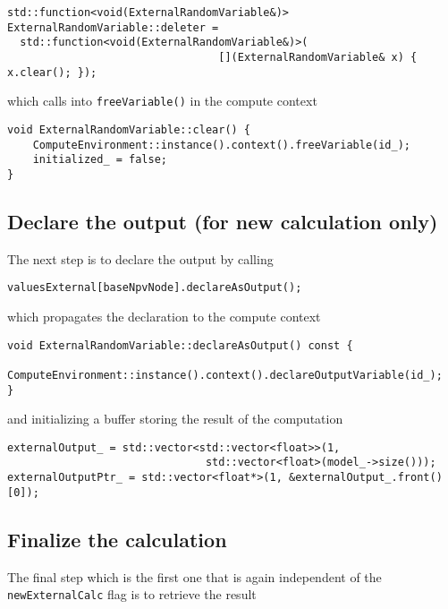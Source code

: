 \documentclass[12pt, a4paper]{article}
\begin{document}
\begin{verbatim}
std::function<void(ExternalRandomVariable&)> ExternalRandomVariable::deleter =
  std::function<void(ExternalRandomVariable&)>(
                                 [](ExternalRandomVariable& x) { x.clear(); });
\end{verbatim}

which calls into \verb+freeVariable()+ in the compute context

\begin{verbatim}
void ExternalRandomVariable::clear() {
    ComputeEnvironment::instance().context().freeVariable(id_);
    initialized_ = false;
}
\end{verbatim}

\subsection{Declare the output (for new calculation only)}

The next step is to declare the output by calling

\begin{verbatim}
valuesExternal[baseNpvNode].declareAsOutput();
\end{verbatim}

which propagates the declaration to the compute context

\begin{verbatim}
void ExternalRandomVariable::declareAsOutput() const {
    ComputeEnvironment::instance().context().declareOutputVariable(id_);
}
\end{verbatim}

and initializing a buffer storing the result of the computation

\begin{verbatim}
externalOutput_ = std::vector<std::vector<float>>(1,
                               std::vector<float>(model_->size()));
externalOutputPtr_ = std::vector<float*>(1, &externalOutput_.front()[0]);
\end{verbatim}

\subsection{Finalize the calculation}

The final step which is the first one that is again independent of the \verb+newExternalCalc+ flag is to retrieve the result
\end{document}
